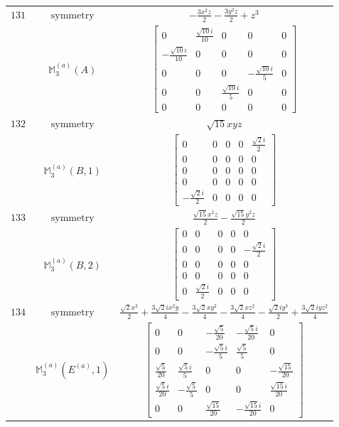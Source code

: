 \documentclass[fleqn,8pt,landscape]{jsarticle}
\begin{document}
\begin{longtable}{ccc}
$ 131 $ & $ \text{symmetry} $ & $ - \frac{3 x^{2} z}{2} - \frac{3 y^{2} z}{2} + z^{3} $ \\
$  $ & $ \mathbb{M}_{3}^{(a)}(A) $ & $ \begin{bmatrix} 0 & \frac{\sqrt{10} i}{10} & 0 & 0 & 0 \\ - \frac{\sqrt{10} i}{10} & 0 & 0 & 0 & 0 \\ 0 & 0 & 0 & - \frac{\sqrt{10} i}{5} & 0 \\ 0 & 0 & \frac{\sqrt{10} i}{5} & 0 & 0 \\ 0 & 0 & 0 & 0 & 0 \end{bmatrix} $ \\ \hline
$ 132 $ & $ \text{symmetry} $ & $ \sqrt{15} x y z $ \\
$  $ & $ \mathbb{M}_{3}^{(a)}(B,1) $ & $ \begin{bmatrix} 0 & 0 & 0 & 0 & \frac{\sqrt{2} i}{2} \\ 0 & 0 & 0 & 0 & 0 \\ 0 & 0 & 0 & 0 & 0 \\ 0 & 0 & 0 & 0 & 0 \\ - \frac{\sqrt{2} i}{2} & 0 & 0 & 0 & 0 \end{bmatrix} $ \\ \hline
$ 133 $ & $ \text{symmetry} $ & $ \frac{\sqrt{15} x^{2} z}{2} - \frac{\sqrt{15} y^{2} z}{2} $ \\
$  $ & $ \mathbb{M}_{3}^{(a)}(B,2) $ & $ \begin{bmatrix} 0 & 0 & 0 & 0 & 0 \\ 0 & 0 & 0 & 0 & - \frac{\sqrt{2} i}{2} \\ 0 & 0 & 0 & 0 & 0 \\ 0 & 0 & 0 & 0 & 0 \\ 0 & \frac{\sqrt{2} i}{2} & 0 & 0 & 0 \end{bmatrix} $ \\ \hline
$ 134 $ & $ \text{symmetry} $ & $ \frac{\sqrt{2} x^{3}}{2} + \frac{3 \sqrt{2} i x^{2} y}{4} - \frac{3 \sqrt{2} x y^{2}}{4} - \frac{3 \sqrt{2} x z^{2}}{4} - \frac{\sqrt{2} i y^{3}}{2} + \frac{3 \sqrt{2} i y z^{2}}{4} $ \\
$  $ & $ \mathbb{M}_{3}^{(a)}(E^{(a)},1) $ & $ \begin{bmatrix} 0 & 0 & - \frac{\sqrt{5}}{20} & - \frac{\sqrt{5} i}{20} & 0 \\ 0 & 0 & - \frac{\sqrt{5} i}{5} & \frac{\sqrt{5}}{5} & 0 \\ \frac{\sqrt{5}}{20} & \frac{\sqrt{5} i}{5} & 0 & 0 & - \frac{\sqrt{15}}{20} \\ \frac{\sqrt{5} i}{20} & - \frac{\sqrt{5}}{5} & 0 & 0 & \frac{\sqrt{15} i}{20} \\ 0 & 0 & \frac{\sqrt{15}}{20} & - \frac{\sqrt{15} i}{20} & 0 \end{bmatrix} $ \\ \hline

\end{longtable}
\end{document}
